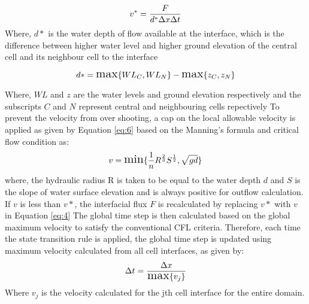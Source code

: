 \begin{equation} \label {eq:4}
	\Large v^{*} = \frac{F}{d^{*}\Delta{x}\Delta{t}}
\end{equation}
Where, $ d*$ is the water depth of flow available at the interface, which is the difference between higher water level and higher ground elevation of the central cell and its neighbour cell to the interface

\begin{equation} \label{eq:5}
	\Large d* = \text{max} \{WL_{C}, WL_{N}\} - \text{max}\{z_{C}, z_{N}\}
\end{equation}

Where, $WL$ and $z$ are the water levels and ground elevation respectively and the subscripts $C$ and $N$ represent central and neighbouring cells repectively
To prevent the velocity from over shooting, a cap on the local allowable velocity is applied as given by Equation \ref{eq:6} based on the Manning's formula and critical flow condition as:
\begin{equation} \label{eq:6}
	\Large v = \text{min}\{\frac{1}{n}R^{\frac{2}{3}}S^{\frac{1}{2}}, \sqrt{gd}\}
\end{equation}
where, the hydraulic radius R is taken to be equal to the water depth $d$ and $S$ is the slope of water surface elevation and is always positive for outflow calculation. If $v$ is less than $v*$, the interfacial flux $F$ is recalculated by replacing $v*$ with $v$ in Equation \ref{eq:4}
The global time step is then calculated based on the global maximum velocity to satisfy the conventional CFL criteria. Therefore, each time the state transition rule is applied, the global time step is updated using maximum velocity calculated from all cell interfaces, as given by:
\begin{equation} \label{eq:7}
	\Large \Delta{t} = \frac{\Delta{x}}{\text{max}\{v_{j}\}}
\end{equation}
Where $v_{j}$ is the velocity calculated for the jth cell interface for the entire domain.

%
%
